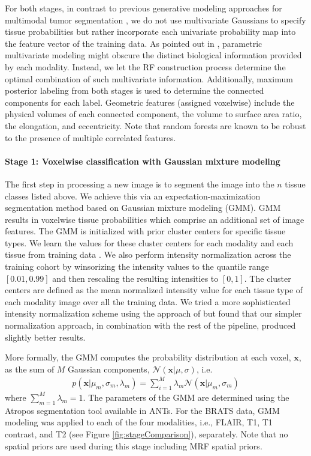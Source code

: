 \documentclass[preprint,authoryear,review,12pt]{elsarticle}
\begin{document}
For both stages, in contrast to previous generative
modeling approaches for multimodal tumor segmentation 
\citep[e.g.,][]{prastawa2003}, we do not use multivariate 
Gaussians to specify tissue probabilities but rather incorporate each
univariate probability map into the feature vector of the training
data.  As pointed out in \cite{menze2010}, parametric multivariate modeling
might obscure the distinct biological information provided by each 
modality.  Instead, we let the RF construction 
process determine the optimal combination of such multivariate
information.  Additionally, maximum posterior labeling from both stages
is used to determine the connected components for each label.  
Geometric features (assigned voxelwise) include the physical volumes 
of each connected component, the volume to surface area ratio, 
the elongation, and eccentricity.  Note that random forests are
known to be robust to the presence of multiple correlated features.

\paragraph{Stage 1:  Voxelwise classification with Gaussian mixture
  modeling} 
The first step in processing a new image is to segment the image into
the $n$ tissue classes listed above.   We achieve this via an expectation-maximization
segmentation method based on
Gaussian mixture modeling (GMM).  GMM results in voxelwise
tissue probabilities which comprise an additional set of image
features.  The GMM is initialized with prior cluster centers for
specific tissue types.  We learn the values for these cluster centers
for each modality and each tissue from training data
\citep{reynolds2009}.  We also perform intensity normalization
across the training cohort by winsorizing the intensity values to the quantile
range $[0.01, 0.99]$ and then rescaling the resulting intensities to 
$[0, 1]$.  The cluster centers are defined as the mean
normalized intensity value for each tissue type of each modality 
image over all the training data.  We tried a more sophisticated intensity
normalization scheme using the approach of \cite{nyul2000} but found that
our simpler normalization approach, in combination with the rest of the
pipeline, produced slightly better results.  

More formally, the GMM computes the 
probability distribution at each voxel, $\mathbf{x}$, as the
sum of $M$ Gaussian components, $\mathcal{N}(\mathbf{x}|\mu,\sigma)$, i.e.
\begin{align}
p\left(\mathbf{x}|\mu_m,\sigma_m,\lambda_m\right) = \sum_{i=1}^M \lambda_m \mathcal{N}(\mathbf{x}|\mu_m,\sigma_m)
\end{align}
where $\sum_{m=1}^M \lambda_m = 1$.  The parameters of the GMM 
are determined using the Atropos segmentation tool \citep{avants2011} available in ANTs.
For the BRATS data, GMM modeling was applied to each of the four modalities, i.e.,
FLAIR, T1, T1 contrast, and T2 (see Figure \ref{fig:stageComparison}), separately.  
Note that no spatial priors are used during this stage including MRF spatial priors.
\end{document}
